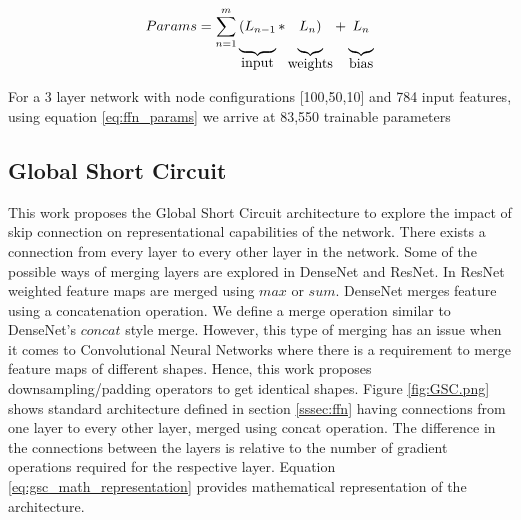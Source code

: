 \documentclass{article}
\begin{document}
\begin{equation}
\label{eq:ffn_params}
Params= \sum_{n=1}^{m}
\underbrace{(L_{n-1}\rule[-12pt]{0pt}{5pt}}_{\mbox{input}}
*\underbrace{L_{n})\rule[-12pt]{0pt}{5pt}}_{\mbox{weights}}
+\underbrace{L_{n}\rule[-12pt]{0pt}{5pt}}_{\mbox{bias}}
\end{equation}

For a 3 layer network with node configurations [100,50,10] and 784 input features, using equation \ref{eq:ffn_params} we arrive at 83,550 trainable parameters


\subsection{Global Short Circuit}
This work proposes the Global Short Circuit architecture to explore the impact of skip connection on representational capabilities of the network. There exists a connection from every layer to every other layer in the network. Some of the possible ways of merging layers are explored in DenseNet\cite{Li2018DenselyCC} and ResNet\cite{He2016DeepRL}. In ResNet weighted feature maps are merged using $max$ or $sum$. DenseNet merges feature using a concatenation operation. We define a merge operation similar to DenseNet's $concat$ style merge. However, this type of merging has an issue when it comes to Convolutional Neural Networks where there is a requirement to merge feature maps of different shapes. Hence, this work proposes downsampling/padding operators to get identical shapes. Figure \ref{fig:GSC.png} shows standard architecture defined in section \ref{sssec:ffn} having connections from one layer to every other layer, merged using concat operation. The difference in the connections between the layers is relative to the number of gradient operations required for the respective layer. Equation \ref{eq:gsc_math_representation} provides mathematical representation of the architecture.
\end{document}
